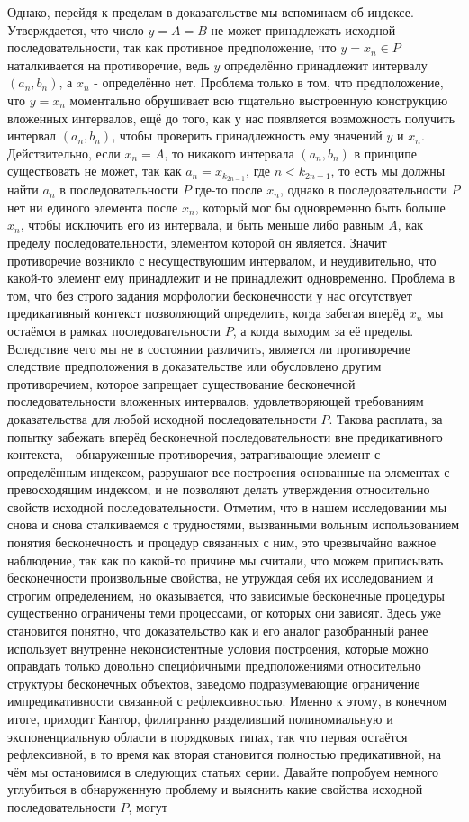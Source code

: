 \documentclass[12pt]{article}
\begin{document}
Однако, перейдя к пределам в доказательстве мы вспоминаем об индексе. Утверждается, что число $y = A = B$ не может принадлежать исходной последовательности, так как противное предположение, что $y = x_{n} \in P$ наталкивается на противоречие, ведь $y$ определённо принадлежит интервалу $(a_n, b_n)$, а $x_n$ - определённо нет. Проблема только в том, что предположение, что $y = x_{n}$ моментально обрушивает всю тщательно выстроенную конструкцию вложенных интервалов, ещё до того, как у нас появляется возможность получить интервал $(a_n, b_n)$, чтобы проверить принадлежность ему значений $y$ и $x_n$. Действительно, если $x_n = A$, то никакого интервала $(a_n, b_n)$ в принципе существовать не может, так как $a_n = x_{k_{2n - 1}}$, где $n < k_{2n - 1}$, то есть мы должны найти $a_n$ в последовательности $P$ где-то после $x_n$, однако в последовательности $P$ нет ни единого элемента после $x_n$, который мог бы одновременно быть больше $x_n$, чтобы исключить его из интервала, и быть меньше либо равным $A$, как пределу последовательности, элементом которой он является. Значит противоречие возникло с несуществующим интервалом, и неудивительно, что какой-то элемент ему принадлежит и не принадлежит одновременно. Проблема в том, что без строго задания морфологии бесконечности у нас отсутствует предикативный контекст позволяющий определить, когда забегая вперёд $x_n$ мы остаёмся в рамках последовательности $P$, а когда выходим за её пределы. Вследствие чего мы не в состоянии различить, является ли противоречие следствие предположения в доказательстве или обусловлено другим противоречием, которое запрещает существование бесконечной последовательности вложенных интервалов, удовлетворяющей требованиям доказательства для любой исходной последовательности $P$. Такова расплата, за попытку забежать вперёд бесконечной последовательности вне предикативного контекста, - обнаруженные противоречия, затрагивающие элемент с определённым индексом, разрушают все построения основанные на элементах с превосходящим индексом, и не позволяют делать утверждения относительно свойств исходной последовательности. Отметим, что в нашем исследовании мы снова и снова сталкиваемся с трудностями, вызванными вольным использованием понятия бесконечность и процедур связанных с ним, это чрезвычайно важное наблюдение, так как по какой-то причине мы считали, что можем приписывать бесконечности произвольные свойства, не утруждая себя их исследованием и строгим определением, но оказывается, что зависимые бесконечные процедуры существенно ограничены теми процессами, от которых они зависят. Здесь уже становится понятно, что доказательство как и его аналог разобранный ранее использует внутренне неконсистентные условия построения, которые можно оправдать только довольно специфичными предположениями относительно структуры бесконечных объектов, заведомо подразумевающие ограничение импредикативности связанной с рефлексивностью. Именно к этому, в конечном итоге, приходит Кантор, филигранно разделивший полиномиальную и экспоненциальную области в порядковых типах, так что первая остаётся рефлексивной, в то время как вторая становится полностью предикативной, на чём мы остановимся в следующих статьях серии. Давайте попробуем немного углубиться в обнаруженную проблему и выяснить какие свойства исходной последовательности $P$, могут 
\end{document}
